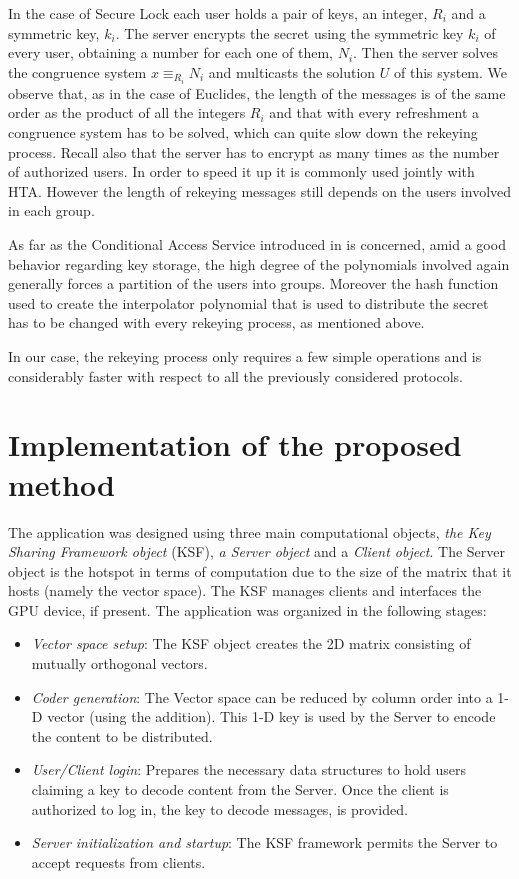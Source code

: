 \documentclass[a4paper,11pt]{amsart}
\theoremstyle{definition}
\begin{document}
\medskip

In the case of Secure Lock each user holds a pair of keys, an integer, $R_i$ and a symmetric key,
$k_i$. The server encrypts the secret using the symmetric key $k_i$ of
every user, obtaining a number for each one of them, $N_i$. Then the
server solves the congruence system $x \equiv_{R_i}N_i$ and multicasts
the solution $U$ of this system.  We observe that, as in the case of
Euclides, the length of the messages is of the same order as the
product of all the integers $R_i$ and that with every refreshment a
congruence system has to be solved, which can quite slow down the
rekeying process. Recall also that the server has to encrypt as many
times as the number of authorized users. In order to speed it up it is
commonly used jointly with HTA. However the length of rekeying
messages still depends on the users involved in each group.

As far as the Conditional Access Service introduced in \cite{cas} is
concerned, amid a good behavior regarding key storage, the high degree of the polynomials involved again generally forces a
partition of the users into
groups. Moreover the hash function used to create the interpolator polynomial
that is used to distribute the secret has to be changed with every
rekeying process, as mentioned above.

In our case, the rekeying process only requires a few simple
operations and is considerably faster with respect to all the
previously considered protocols. 










\section{Implementation of the proposed method}

The application was designed using three main computational objects, {\em the Key Sharing Framework object} (KSF), {\em a Server object} and
a {\em Client object}. The Server object is the hotspot in terms of computation due to the size of the matrix that it hosts (namely the vector space). The KSF manages clients and interfaces the GPU device, if present. The application was organized in the following stages:
\begin{itemize}
\item \emph{Vector space setup}: The KSF object creates the 2D matrix consisting of mutually orthogonal vectors.
\item \emph{Coder generation}: The Vector space can be reduced by column order into a 1-D vector (using the addition). This 1-D key is used by the Server to encode the content to be distributed.
\item \emph{User/Client login}: Prepares the necessary data structures to hold users claiming a key to decode content from the Server. Once the client is authorized to log in, the key to decode messages, is provided. 
\item \emph{Server initialization and startup}: The KSF framework permits the Server to accept requests from clients.
\end{itemize}
\end{document}
